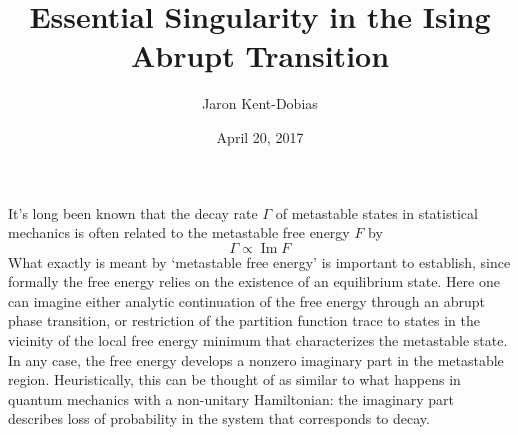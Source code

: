 \documentclass[fleqn]{article}
\title{Essential Singularity in the Ising Abrupt Transition}
\author{Jaron Kent-Dobias}
\date{April 20, 2017}
\begin{document}
\def\[{\begin{equation}}
\def\]{\end{equation}}

\def\im{\mathop{\mathrm{Im}}\nolimits}
\def\dd{\mathrm d}
\def\O{\mathcal O}
\def\ei{\mathop{\mathrm{Ei}}\nolimits}
\def\b{\mathrm b}

\newcommand\pd[3][]{
  \ifthenelse{\isempty{#1}}
    {\def\tmp{}}
    {\def\tmp{^#1}}
  \frac{\partial\tmp#2}{\partial#3\tmp}
}

\maketitle

\begin{abstract}
\end{abstract}

It's long been known that the decay rate $\Gamma$ of metastable states in
statistical mechanics is often related to the metastable free energy $F$ by
\cite{langer.1967.condensation,langer.1969.metastable,gaveau.1989.analytic}
\[
  \Gamma\propto\im F
\]
What exactly is meant by `metastable free energy' is important to establish,
since formally the free energy relies on the existence of an equilibrium
state. Here one can imagine either analytic continuation of the free energy
through an abrupt phase transition, or restriction of the partition function
trace to states in the vicinity of the local free energy minimum that
characterizes the metastable state. In any case, the free energy develops a
nonzero imaginary part in the metastable region. Heuristically, this can be
thought of as similar to what happens in quantum mechanics with a non-unitary
Hamiltonian: the imaginary part describes loss of probability in the system
that corresponds to decay. 
\end{document}
